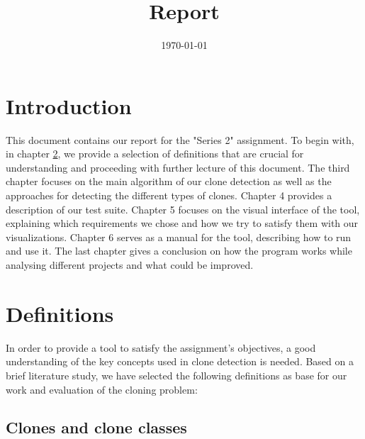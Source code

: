 \documentclass{uva-inf-article}
\title{Report}
\date{\today}
\begin{document}
\maketitle




\section{Introduction}

This document contains our report for the "Series 2" assignment. To begin with, in chapter \ref{definitions}, we provide a selection of definitions that are crucial for understanding and proceeding with further lecture of this document. The third chapter focuses on the main algorithm of our clone detection as well as the approaches for detecting the different types of clones. Chapter 4 provides a description of our test suite. Chapter 5 focuses on the visual interface of the tool, explaining which requirements we chose and how we try to satisfy them with our visualizations. Chapter 6 serves as a manual for the tool, describing how to run and use it. The last chapter gives a conclusion on how the program works while analysing different projects and what could be improved.

\section{Definitions}\label{definitions}

In order to provide a tool to satisfy the assignment's objectives, a good understanding of the key concepts used in clone detection is needed. Based on a brief literature study, we have selected the following definitions as base for our work and evaluation of the cloning problem:

\subsection{Clones and clone classes}
\end{document}
